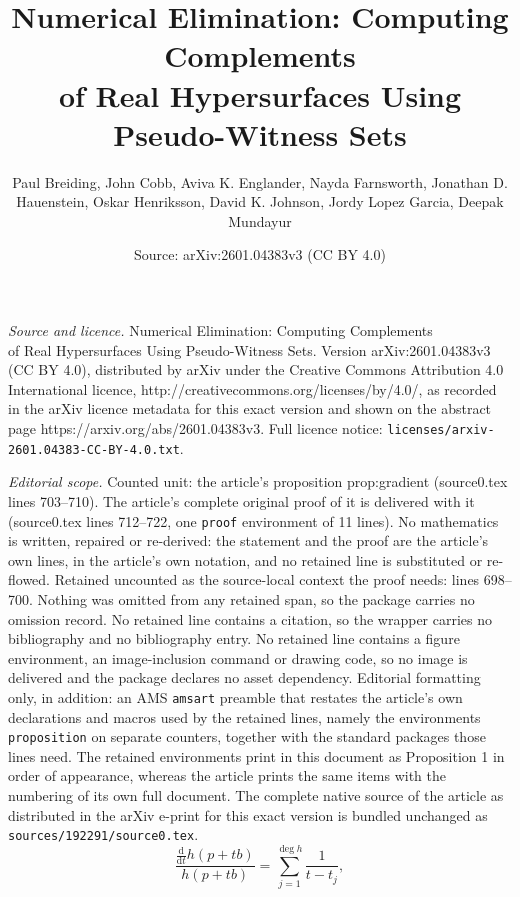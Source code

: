 \documentclass[10pt,a4paper]{amsart}
\title{Numerical Elimination: Computing Complements\\ of Real Hypersurfaces Using Pseudo-Witness Sets}
\author{Paul Breiding, John Cobb, Aviva K. Englander, Nayda Farnsworth, Jonathan D. Hauenstein, Oskar Henriksson, David K. Johnson, Jordy Lopez Garcia, Deepak Mundayur}
\date{Source: arXiv:2601.04383v3 (CC BY 4.0)}
\begin{document}
\maketitle

\noindent\emph{Source and licence.} Numerical Elimination: Computing Complements\\ of Real Hypersurfaces Using Pseudo-Witness Sets. Version arXiv:2601.04383v3 (CC BY 4.0), distributed by arXiv under the Creative Commons Attribution 4.0 International licence, http://creativecommons.org/licenses/by/4.0/, as recorded in the arXiv licence metadata for this exact version and shown on the abstract page https://arxiv.org/abs/2601.04383v3. Full licence notice: \texttt{licenses/arxiv-2601.04383-CC-BY-4.0.txt}.\par\smallskip

\noindent\textit{Editorial scope.} Counted unit: the article's proposition prop:gradient (source0.tex lines 703--710). The article's complete original proof of it is delivered with it (source0.tex lines 712--722, one \texttt{proof} environment of 11 lines). No mathematics is written, repaired or re-derived: the statement and the proof are the article's own lines, in the article's own notation, and no retained line is substituted or re-flowed.  Retained uncounted as the source-local context the proof needs: lines 698--700.  Nothing was omitted from any retained span, so the package carries no omission record.  No retained line contains a citation, so the wrapper carries no bibliography and no bibliography entry.  No retained line contains a figure environment, an image-inclusion command or drawing code, so no image is delivered and the package declares no asset dependency.  Editorial formatting only, in addition: an AMS \texttt{amsart} preamble that restates the article's own declarations and macros used by the retained lines, namely the environments \texttt{proposition} on separate counters, together with the standard packages those lines need.  The retained environments print in this document as Proposition 1 in order of appearance, whereas the article prints the same items with the numbering of its own full document.  The complete native source of the article as distributed in the arXiv e-print for this exact version is bundled unchanged as \texttt{sources/192291/source0.tex}.
\begin{equation}\label{eq:directional-rational-h-complex}
    \frac{\frac{\mathrm{d}}{\mathrm{d}t}h(p+tb)}{h(p+tb)} = \sum_{j=1}^{\deg h}\frac{1}{t-t_{j}},
\end{equation}
\end{document}
